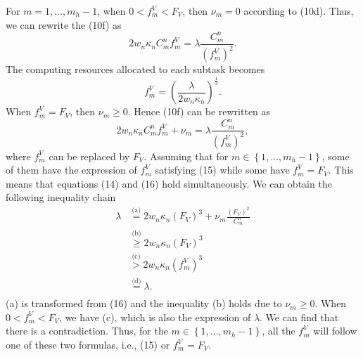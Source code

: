 \documentclass[lettersize,journal]{IEEEtran}
\begin{document}
For $m=1,\ldots,m_h-1$, when $0<f^{V}_{m}<F_V$, then $\nu_m = 0$ according to (10d). Thus, we can rewrite the (10f) as
{\setlength\abovedisplayskip{8pt}
\setlength\belowdisplayskip{8pt}
\begin{equation*}
2w_n\kappa_n C_m^n f^{V}_{m}=\lambda \frac {C_m^n}{\left ({f^V_{m}}\right)^{2}}. \tag{14}
\end{equation*}}
The computing resources allocated to each subtask becomes
{\setlength\abovedisplayskip{8pt}
\setlength\belowdisplayskip{8pt}
\begin{equation*}
f^V_{m}=\left(\frac{\lambda}{2w_n\kappa_n}\right)^{\frac{1}{3}}. \tag{15}
\end{equation*}}
When $f^{V}_{m}=F_V$, then $\nu_m\geq0$. Hence (10f) can be rewritten as
{\setlength\abovedisplayskip{8pt}
\setlength\belowdisplayskip{8pt}
\begin{equation*}
2w_n\kappa_n C_m^n f^{V}_{m}+\nu_m=\lambda \frac {C_m^n}{\left ({f^V_{m}}\right)^{2}}, \tag{16}
\end{equation*}}
where $f^V_{m}$ can be replaced by $F_V$. Assuming that for
$m \in \left\{1,\ldots,m_h-1\right\}$, some of them have the expression of $f^V_{m}$ satisfying (15) while some have $f^{V}_{m}=F_V$. This means that equations (14) and (16) hold simultaneously. We can obtain the following inequality chain
\begin{align*}
\lambda &\overset{\text{(a)}}{=} 2w_n\kappa_n \left(F_V\right)^3 + \nu_m \frac{\left(F_V\right)^2}{C_m^n} \\
&\overset{\text{(b)}}{\geq} 2w_n\kappa_n \left(F_V\right)^3 \\
&\overset{\text{(c)}}{>} 2w_n\kappa_n \left(f^V_{m}\right)^3 \\
&\overset{\text{(d)}}{=} \lambda. \tag{17}\\
\end{align*}
(a) is transformed from (16) and the inequality (b) holds due to $\nu_m\geq0$. When $0<f^{V}_{m}<F_V$, we have (c), which is also the expression of $\lambda$. We can find that there is a contradiction. Thus, for the $m \in \left\{1,\ldots,m_h-1\right\}$, all the $f^V_{m}$ will follow one of these two formulas, i.e., (15) or $f^{V}_{m}=F_V$.
\end{document}
